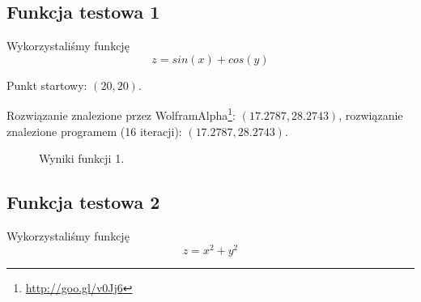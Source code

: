 \documentclass{classrep}
\begin{document}
\subsection{Funkcja testowa 1}
Wykorzystaliśmy funkcję
\begin{equation}
  z = sin(x) + cos(y)
\end{equation}

Punkt startowy: $(20, 20)$.

Rozwiązanie znalezione przez WolframAlpha\footnote{\url{http://goo.gl/v0Jj6}}: $(17.2787, 28.2743)$, rozwiązanie znalezione programem (16 iteracji): $(17.2787, 28.2743)$.

\begin{figure}
\noindent{}
\caption{Wyniki funkcji 1.}
\end{figure}

\subsection{Funkcja testowa 2}
Wykorzystaliśmy funkcję
\begin{equation}
  z = x^2 + y^2
\end{equation}
\end{document}
